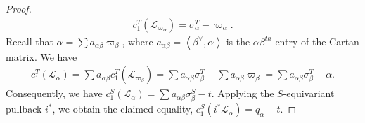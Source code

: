 \documentclass[10pt]{article}
\numberwithin{thm}{section}
\theoremstyle{definition}
\theoremstyle{remark}
\begin{document}
\begin{proof}
\begin{align*}
c_1^T(\mathcal L_{\varpi_\alpha})=\sigma^T_\alpha-\varpi_\alpha.
\end{align*}
Recall that $\alpha=\sum a_{\alpha\beta}\varpi_\beta$,
where $a_{\alpha\beta}=\left\langle\beta^\vee,\alpha\right\rangle$
is the $\alpha\beta^{th}$ entry of the Cartan matrix.
We have
\begin{align*}
c_1^T(\mathcal L_\alpha)
=\sum a_{\alpha\beta} c_1^T(\mathcal L_{\varpi_\beta})
=\sum a_{\alpha\beta}\sigma^T_\beta-\sum a_{\alpha\beta}\varpi_\beta
=\sum a_{\alpha\beta}\sigma^T_\beta-\alpha.
\end{align*}
Consequently, we have
$
c_1^S(\mathcal L_\alpha)
=\sum a_{\alpha\beta}\sigma^S_\beta-t. %
$
Applying the $S$-equivariant pullback $i^*$, we obtain the claimed equality,
$c_1^S(i^*\mathcal L_\alpha)=q_\alpha-t$.
\end{proof}
\end{document}
